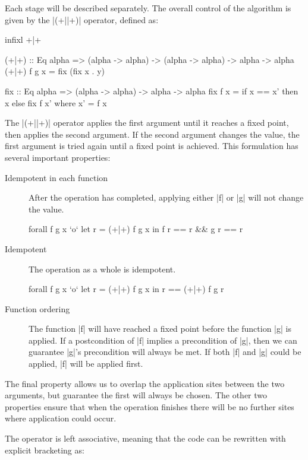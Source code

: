 \documentclass[preprint]{sigplanconf}
\begin{document}
Each stage will be described separately. The overall control of the algorithm is given by the |(+||+)| operator, defined as:

\begin{code}
infixl +|+

(+|+) :: Eq alpha => (alpha -> alpha) -> (alpha -> alpha) -> alpha -> alpha
(+|+) f g x  = fix (fix x . y)

fix :: Eq alpha => (alpha -> alpha) -> alpha -> alpha
fix f x = if x == x' then x else fix f x'
    where x' = f x
\end{code}

The |(+||+)| operator applies the first argument until it reaches a fixed point, then applies the second argument. If the second argument changes the value, the first argument is tried again until a fixed point is achieved. This formulation has several important properties:

\begin{description}
\item[Idempotent in each function] After the operation has completed, applying either |f| or |g| will not change the value.

\begin{code}
forall f g x `o` let r = (+|+) f g x in f r == r && g r == r
\end{code}

\item[Idempotent] The operation as a whole is idempotent.

\begin{code}
forall f g x `o` let r = (+|+) f g x in r == (+|+) f g r
\end{code}

\item[Function ordering] The function |f| will have reached a fixed point before the function |g| is applied. If a postcondition of |f| implies a precondition of |g|, then we can guarantee |g|'s precondition will always be met. If both |f| and |g| could be applied, |f| will be applied first.
\end{description}

The final property allows us to overlap the application sites between the two arguments, but guarantee the first will always be chosen. The other two properties ensure that when the operation finishes there will be no further sites where application could occur.

The operator is left associative, meaning that the code can be rewritten with explicit bracketing as:
\end{document}
